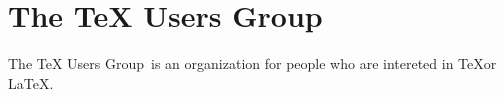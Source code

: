 \documentclass{article}
\newcommand{\TUG}{TeX Users Group}
\begin{document}
\section{The \TUG}

The \TUG\ is an organization for people who are intereted in \TeX or \LaTeX.
\end{document}
